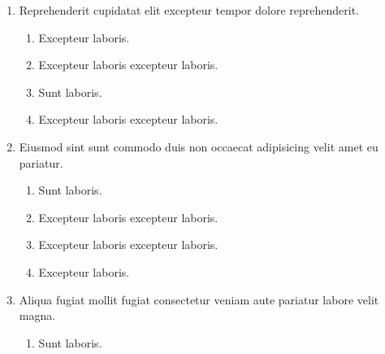 \documentclass[a4paper,12pt]{article}
\begin{document}
\begin{enumerate}[label=\textbf{\arabic*.}]
\begin{multicols}{2}
\begin{enumerate}
		\item  Excepteur laboris.
    
		\item  Excepteur laboris excepteur laboris.
    
		\item  Sunt laboris.
    
	\end{enumerate}

\end{multicols}
\item Reprehenderit cupidatat elit excepteur tempor dolore reprehenderit.
\begin{multicols}{2}
	\begin{enumerate}
		\item  Excepteur laboris.
    
		\item  Excepteur laboris excepteur laboris.
  
		\item  Sunt laboris.
    
		\item  Excepteur laboris excepteur laboris.
    
	\end{enumerate}

\end{multicols}
\item Eiusmod sint sunt commodo duis non occaecat adipisicing velit amet eu pariatur.
\begin{multicols}{2}
	\begin{enumerate}
		\item  Sunt laboris.
    
		\item  Excepteur laboris excepteur laboris.
    
		\item  Excepteur laboris excepteur laboris.
  
		\item  Excepteur laboris.
    
	\end{enumerate}

\end{multicols}
\item Aliqua fugiat mollit fugiat consectetur veniam aute pariatur labore velit magna.
\begin{multicols}{2}
	\begin{enumerate}
		\item  Sunt laboris.
    

\end{enumerate}
\end{multicols}
\end{enumerate}
\end{document}
